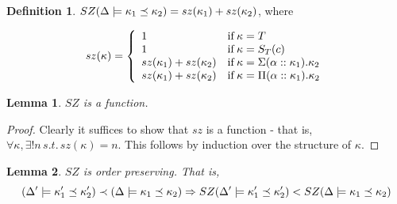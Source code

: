 \documentclass[12pt,twoside,fleqn]{amsart}
\theoremstyle{plain}
\theoremstyle{plain}
\newtheorem{lem}{Lemma}
\theoremstyle{definition}
\newtheorem{defn}{Definition}
\begin{document}
\begin{defn}
\( SZ(\Delta  \models \kappa _{1} \preceq \kappa _{2})=sz(\kappa _{1})+sz(\kappa _{2}) \),
where


\[
sz(\kappa )=\left\{ \begin{array}{ll}
1 & \mathrm{if}\, \kappa =T\\
1 & \mathrm{if}\, \kappa =S_{T}(c )\\
sz(\kappa _{1})+sz(\kappa _{2}) & \mathrm{if}\, \kappa =\Sigma (\alpha ::\kappa _{1}).\kappa _{2}\\
sz(\kappa _{1})+sz(\kappa _{2}) & \mathrm{if}\, \kappa =\Pi (\alpha ::\kappa _{1}).\kappa _{2}
\end{array}\right. \]

\end{defn}
\begin{lem}
\( SZ \) is a function.
\end{lem}
\begin{proof}
Clearly it suffices to show that \( sz \) is a function - that is, \( \forall \kappa ,\exists !n\, s.t.\, sz(\kappa )=n \).
This follows by induction over the structure of \( \kappa  \).
\end{proof}
\begin{lem}
\( SZ \) is order preserving. That is, 
\[
(\Delta ' \models \kappa _{1}' \preceq \kappa _{2}')\prec (\Delta  \models \kappa _{1} \preceq \kappa _{2})\Rightarrow SZ(\Delta ' \models \kappa _{1}' \preceq \kappa _{2}')<SZ(\Delta  \models \kappa _{1} \preceq \kappa _{2})\]

\end{lem}
\end{document}

